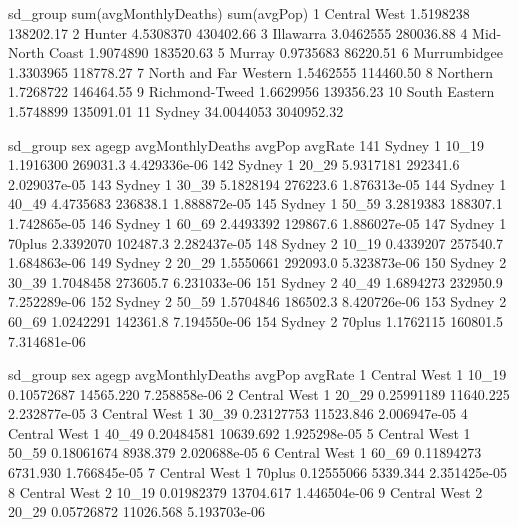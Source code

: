 \documentclass[a4paper]{article}                %
\begin{document}
\begin{Schunk}
\begin{Soutput}
\end{Soutput}
\begin{Soutput}
                sd_group sum(avgMonthlyDeaths) sum(avgPop)
1           Central West             1.5198238   138202.17
2                 Hunter             4.5308370   430402.66
3              Illawarra             3.0462555   280036.88
4        Mid-North Coast             1.9074890   183520.63
5                 Murray             0.9735683    86220.51
6           Murrumbidgee             1.3303965   118778.27
7  North and Far Western             1.5462555   114460.50
8               Northern             1.7268722   146464.55
9         Richmond-Tweed             1.6629956   139356.23
10         South Eastern             1.5748899   135091.01
11                Sydney            34.0044053  3040952.32
\end{Soutput}
\begin{Soutput}
    sd_group sex  agegp avgMonthlyDeaths   avgPop      avgRate
141   Sydney   1  10_19        1.1916300 269031.3 4.429336e-06
142   Sydney   1  20_29        5.9317181 292341.6 2.029037e-05
143   Sydney   1  30_39        5.1828194 276223.6 1.876313e-05
144   Sydney   1  40_49        4.4735683 236838.1 1.888872e-05
145   Sydney   1  50_59        3.2819383 188307.1 1.742865e-05
146   Sydney   1  60_69        2.4493392 129867.6 1.886027e-05
147   Sydney   1 70plus        2.3392070 102487.3 2.282437e-05
148   Sydney   2  10_19        0.4339207 257540.7 1.684863e-06
149   Sydney   2  20_29        1.5550661 292093.0 5.323873e-06
150   Sydney   2  30_39        1.7048458 273605.7 6.231033e-06
151   Sydney   2  40_49        1.6894273 232950.9 7.252289e-06
152   Sydney   2  50_59        1.5704846 186502.3 8.420726e-06
153   Sydney   2  60_69        1.0242291 142361.8 7.194550e-06
154   Sydney   2 70plus        1.1762115 160801.5 7.314681e-06
\end{Soutput}
\begin{Soutput}
       sd_group sex  agegp avgMonthlyDeaths    avgPop      avgRate
1  Central West   1  10_19       0.10572687 14565.220 7.258858e-06
2  Central West   1  20_29       0.25991189 11640.225 2.232877e-05
3  Central West   1  30_39       0.23127753 11523.846 2.006947e-05
4  Central West   1  40_49       0.20484581 10639.692 1.925298e-05
5  Central West   1  50_59       0.18061674  8938.379 2.020688e-05
6  Central West   1  60_69       0.11894273  6731.930 1.766845e-05
7  Central West   1 70plus       0.12555066  5339.344 2.351425e-05
8  Central West   2  10_19       0.01982379 13704.617 1.446504e-06
9  Central West   2  20_29       0.05726872 11026.568 5.193703e-06

\end{Soutput}
\end{Schunk}
\end{document}
